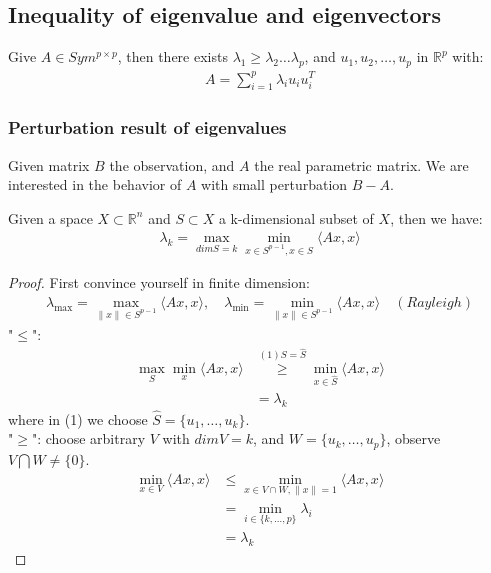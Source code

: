 \subsection{Inequality of eigenvalue and eigenvectors}
\begin{theorem}
	Give $A \in Sym^{p \times p}$, then there exists $\lambda_1 \geq \lambda_2 \dots \lambda_p$, and $u_1, u_2, \dots, u_p$ in $\mathbb{R}^p$ with:
	\begin{align*}
		A = \sum_{i = 1}^p \lambda_i u_i u_i^T
	\end{align*}
\end{theorem}

\subsubsection*{Perturbation result of eigenvalues}
Given matrix $B$ the observation, and $A$ the real parametric matrix. We are interested in the behavior of $A$ with small perturbation $B - A$.
\begin{theorem}
	Given a space $X \subset \mathbb{R}^n$ and $S \subset X$ a k-dimensional subset of $X$, then we have:
	\begin{align*}
		\lambda_k = \max_{dim S = k} \min_{x \in S^{p-1}, x \in S} \langle Ax, x\rangle
	\end{align*}
\end{theorem}
\begin{proof}
	First convince yourself in finite dimension:
	\begin{align*}
		\lambda_{\max} = \max_{\|x\| \in S^{p-1}}\langle Ax, x \rangle, \quad \lambda_{\min} = \min_{\|x\|\in S^{p-1}} \langle Ax, x\rangle \quad (Rayleigh)
	\end{align*}
	"$\le$":
	\begin{align*}
		\max_{S}\min_x \langle Ax, x \rangle &\overset{(1)S = \hat{S}}{\ge} \min_{x\in \hat{S}} \langle Ax, x \rangle \\
		&= \lambda_k 
	\end{align*}
	where in (1) we choose $\hat{S} = \{u_1, \dots, u_k\}$.\\
	"$\geq$": choose arbitrary $V$ with $dimV = k$, and $W= \{ u_k , \dots, u_p\}$, observe $V \bigcap W \neq \{0\}$.
	\begin{align*}
		\min_{x \in V}\langle Ax, x \rangle &\le \min_{x \in V\cap W, \|x\| = 1} \langle Ax, x \rangle \\
		& = \min_{i \in \{k, \dots, p\}} \lambda_i  \\
		&= \lambda_k
	\end{align*}
\end{proof}

